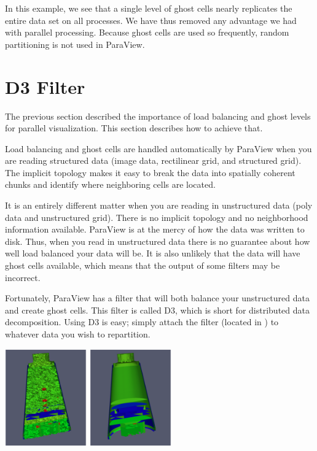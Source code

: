 In this example, we see that a single level of ghost cells nearly
replicates the entire data set on all processes.  We have thus removed any
advantage we had with parallel processing.  Because ghost cells are used so
frequently, random partitioning is not used in ParaView.

\section{D3 Filter}

The previous section described the importance of load balancing and ghost
levels for parallel visualization.  This section describes how to achieve
that.

Load balancing and ghost cells are handled automatically by ParaView when
you are reading structured data (image data, rectilinear grid, and
structured grid).  The implicit topology makes it easy to break the data
into spatially coherent chunks and identify where neighboring cells are
located.

It is an entirely different matter when you are reading in unstructured
data (poly data and unstructured grid).  There is no implicit topology and
no neighborhood information available.  ParaView is at the mercy of how the
data was written to disk.  Thus, when you read in unstructured data there
is no guarantee about how well load balanced your data will be.  It is also
unlikely that the data will have ghost cells available, which means that
the output of some filters may be incorrect.

Fortunately, ParaView has a filter that will both balance your unstructured
data and create ghost cells.  This filter is called D3, which is short for
distributed data decomposition.  Using D3 is easy; simply attach the filter
(located in  \ra {} \ra {}) to whatever
data you wish to repartition.

\begin{inlinefig}
  \includegraphics[height=1.65in]{images/D3ExampleBefore}
  \includegraphics[height=1.65in]{images/D3ExampleAfter}
\end{inlinefig}

